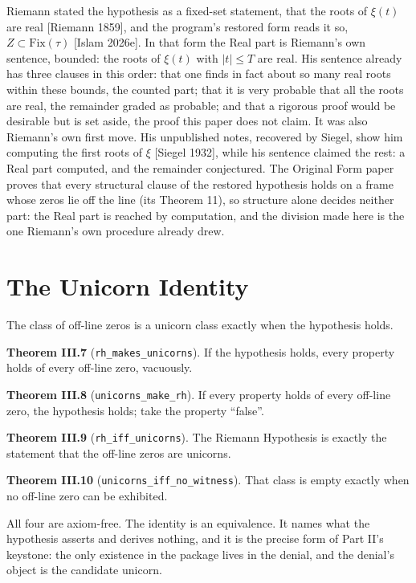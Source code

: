 \documentclass[10pt,twocolumn]{article}
\begin{document}
Riemann stated the hypothesis as a fixed-set statement, that the roots
of \(\xi(t)\) are real {[}Riemann 1859{]}, and the program's restored
form reads it so, \(Z \subset \mathrm{Fix}(\tau)\) {[}Islam 2026e{]}. In
that form the Real part is Riemann's own sentence, bounded: the roots of
\(\xi(t)\) with \(|t| \leq T\) are real. His sentence already has three
clauses in this order: that one finds in fact about so many real roots
within these bounds, the counted part; that it is very probable that all
the roots are real, the remainder graded as probable; and that a
rigorous proof would be desirable but is set aside, the proof this paper
does not claim. It was also Riemann's own first move. His unpublished
notes, recovered by Siegel, show him computing the first roots of
\(\xi\) {[}Siegel 1932{]}, while his sentence claimed the rest: a Real
part computed, and the remainder conjectured. The Original Form paper
proves that every structural clause of the restored hypothesis holds on
a frame whose zeros lie off the line (its Theorem 11), so structure
alone decides neither part: the Real part is reached by computation, and
the division made here is the one Riemann's own procedure already drew.

\hypertarget{the-unicorn-identity}{%
\section{The Unicorn Identity}\label{the-unicorn-identity}}

The class of off-line zeros is a unicorn class exactly when the
hypothesis holds.

\textbf{Theorem III.7} (\texttt{rh\_makes\_unicorns}). If the hypothesis
holds, every property holds of every off-line zero, vacuously.

\textbf{Theorem III.8} (\texttt{unicorns\_make\_rh}). If every property
holds of every off-line zero, the hypothesis holds; take the property
``false''.

\textbf{Theorem III.9} (\texttt{rh\_iff\_unicorns}). The Riemann
Hypothesis is exactly the statement that the off-line zeros are
unicorns.

\textbf{Theorem III.10} (\texttt{unicorns\_iff\_no\_witness}). That
class is empty exactly when no off-line zero can be exhibited.

All four are axiom-free. The identity is an equivalence. It names what
the hypothesis asserts and derives nothing, and it is the precise form
of Part II's keystone: the only existence in the package lives in the
denial, and the denial's object is the candidate unicorn.
\end{document}
